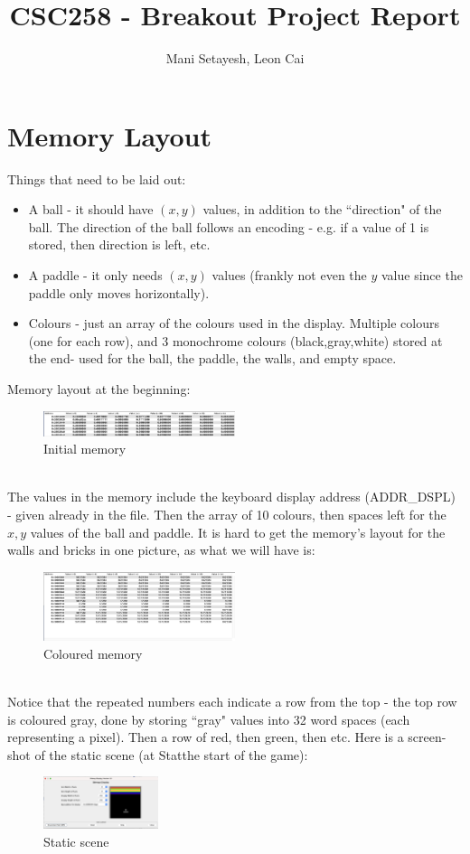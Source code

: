 \documentclass{article}
\author{Mani Setayesh, Leon Cai}
\title{CSC258 - Breakout Project Report}
\begin{document}
\maketitle
\section*{Memory Layout}
Things that need to be laid out:\begin{itemize}
\item A ball - it should have $(x,y)$ values, in addition to the ``direction" of the ball. The direction of the ball follows an encoding - e.g. if a value of 1 is stored, then direction is left, etc.
\item A paddle - it only needs $(x,y)$ values (frankly not even the $y$ value since the paddle only moves horizontally).
\item Colours - just an array of the colours used in the display. Multiple colours (one for each row), and 3 monochrome colours (black,gray,white) stored at the end- used for the ball, the paddle, the walls, and empty space.
\end{itemize}
Memory layout at the beginning:
\begin{figure}[ht!]
    \centering
    \includegraphics[width=0.5\textwidth]{memory_layout.png}
    \caption{Initial memory}
\end{figure}\\
The values in the memory include the keyboard display address (ADDR\_DSPL) - given already in the file. Then the array of 10  colours, then spaces left for the $x,y$ values of the ball and paddle. It is hard to get the memory's layout for the walls and bricks in one picture, as what we will have is: \begin{figure}[ht!]
    \centering
    \includegraphics[width=0.5\textwidth]{colours.png}
    \caption{Coloured memory}
\end{figure}\\ Notice that the repeated numbers each indicate a row from the top - the top row is coloured gray, done by storing ``gray" values into 32 word spaces (each representing a pixel). Then a row of red, then green, then etc.
Here is a screen-shot of the static scene (at Statthe start of the game):\begin{figure}[ht!]
    \centering
    \includegraphics[width=0.3\textwidth]{static_scene.png}
    \caption{Static scene}
\end{figure}\newpage
\end{document}
